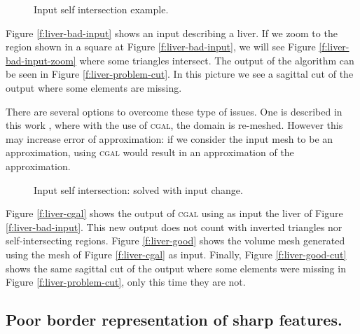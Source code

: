 \documentclass[10pt]{article}
\begin{document}
\begin{figure}[htb]
\centering
\caption{Input self intersection example.}
\label{f:liver}
\end{figure}

Figure \ref{f:liver-bad-input} shows an input describing a liver. If we zoom to the region shown in a square at Figure \ref{f:liver-bad-input}, we will see Figure \ref{f:liver-bad-input-zoom} where some triangles intersect. The output of the algorithm can be seen in Figure \ref{f:liver-problem-cut}. In this picture we see a sagittal cut of the output where some elements are missing.

There are several options to overcome these type of issues. One is described in this work \cite{Lobos2013b}, where with the use of \textsc{cgal}, the domain is re-meshed. However this may increase error of approximation: if we consider the input mesh to be an approximation, using \textsc{cgal} would result in an approximation of the approximation.


\begin{figure}[htb]
\centering
\caption{Input self intersection: solved with input change.}
\label{f:liver-solved}
\end{figure}

Figure \ref{f:liver-cgal} shows the output of \textsc{cgal} using as input the liver of Figure \ref{f:liver-bad-input}. This new output does not count with inverted triangles nor self-intersecting regions. Figure \ref{f:liver-good} shows the volume mesh generated using the mesh of Figure \ref{f:liver-cgal} as input. Finally, Figure \ref{f:liver-good-cut} shows the same sagittal cut of the output where some elements were missing in Figure \ref{f:liver-problem-cut}, only this time they are not.




\subsection{Poor border representation of sharp features.}
\end{document}
